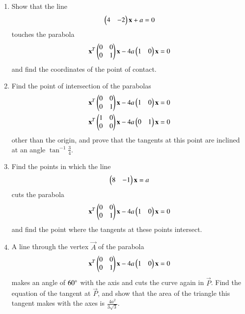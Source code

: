 \renewcommand{\theequation}{\theenumi}
\begin{enumerate}[label=\arabic*.,ref=\thesubsection.\theenumi]
\begin{figure}[!h]
\centering
\texttt{[image: ./figs/parabola.eps]}
\caption{}
\label{fig:parabola}
\end{figure}
\item Show that the line 
\begin{align}
\begin{pmatrix}4 & -2\end{pmatrix}\mathbf{x} + a= 0
\end{align}
touches the parabola 
\begin{align}
\mathbf{x}^T\begin{pmatrix}0 & 0\\0 & 1\end{pmatrix}\mathbf{x}-4a\begin{pmatrix}1 & 0 \end{pmatrix}\mathbf{x}= 0 
\end{align}
and find the coordinates of
the point of contact.
\item Find the point of intersection of the parabolas 
\begin{align}
\mathbf{x}^T\begin{pmatrix}0 & 0\\0 & 1\end{pmatrix}\mathbf{x}-4a\begin{pmatrix}1 & 0 \end{pmatrix}\mathbf{x}= 0 
\\
\mathbf{x}^T\begin{pmatrix}1 & 0\\0 & 0\end{pmatrix}\mathbf{x}-4a\begin{pmatrix}0 & 1 \end{pmatrix}\mathbf{x}= 0 
\end{align}
other than the origin, and prove that the tangents
at this point are inclined at an angle $\tan^{-1}\frac{3}{4}$.
\item Find the points in which the line 
\begin{align}
\begin{pmatrix}8 & -1\end{pmatrix}\mathbf{x} = a
\end{align}
 cuts the parabola 
\begin{align}
\mathbf{x}^T\begin{pmatrix}0 & 0\\0 & 1\end{pmatrix}\mathbf{x}-4a\begin{pmatrix}1 & 0 \end{pmatrix}\mathbf{x}= 0 
\end{align}
and find the point where
the tangents at these points intersect.
\renewcommand{\theequation}{\theenumi}
\item A line through the vertex $\vec{A}$ of the parabola 
\begin{align}
\mathbf{x}^T\begin{pmatrix}0 & 0\\0 & 1\end{pmatrix}\mathbf{x}-4a\begin{pmatrix}1 & 0 \end{pmatrix}\mathbf{x}= 0 
\end{align}
makes an angle of $60\degree$ with
the axis and cuts the curve again in $\vec{P}$.  Find the equation of the tangent at $\vec{P}$,
and show that the area of the triangle this tangent makes with the axes is $\frac{4a^2}{3\sqrt{3}}$.

\end{enumerate}
